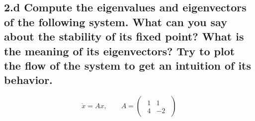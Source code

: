 \documentclass{cmc}
\begin{document}
\clearpage

\subsection*{2.d Compute the eigenvalues and eigenvectors of the following system.
What can you say about the stability of its fixed point? What is the meaning of its
eigenvectors? Try to plot the flow of the system to get an intuition of its behavior.}

  \begin{equation}
    \label{eq:saddle-system}
    \dot{x} = A x,
    \qquad
    A =
    \begin{pmatrix}
      \begin{array}{rr}
        1 & 1 \\
        4 & -2
      \end{array}
    \end{pmatrix}
  \end{equation}


\vspace{0.3\textheight}
\end{document}
